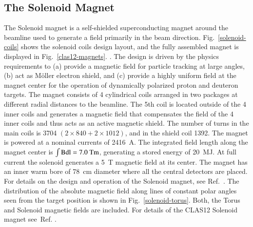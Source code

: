 \documentclass[final,3p,times,twocolumn,authoryear]{elsarticle}
\begin{document}
\subsection{\rm The Solenoid Magnet}
The Solenoid magnet is a self-shielded superconducting magnet around the beamline used 
to generate a field primarily in the beam direction. Fig.~\ref{solenoid-coils} shows the solenoid coils design layout, 
and the fully assembled magnet is displayed in Fig.~\ref{clas12-magnets}.
. 
The design is driven by the physics requirements to (a) provide 
a magnetic field for particle tracking at large angles, (b) act as {\rm M\"oller} electron shield, and (c) provide 
a highly uniform field at the magnet center for the operation of dynamically polarized proton and deuteron targets.
The magnet consists of 4 cylindrical coils arranged in two packages at different radial distances to the beamline. 
The 5th coil is located outside of the 4 inner coils and generates a magnetic field that compensates the field 
of the 4 inner coils and thus acts as an active magnetic shield. The number of turns in the main coils is 
3704 $(2 \times 840 + 2 \times 1012)$, and in the shield coil 1392. The magnet is powered at a nominal currents of 2416~A. 
The integrated field length along the magnet center is $\rm \int Bdl = 7.0 \rm~Tm$, generating a stored energy of 20~MJ.  
At full current the solenoid generates a 5~T magnetic field at its center. The magnet has an inner warm bore of 78~cm diameter where all the 
 central detectors are placed.  For details on the design and operation of the Solenoid magnet, see Ref.~\cite{clas12-magnets}. The distribution of the absolute magnetic field along lines of constant polar angles seen from the target position is shown in Fig.~\ref{solenoid-torus}. Both, the Torus and Solenoid magnetic fields are included. For details of the CLAS12 Solenoid magnet see~Ref. \cite{clas12-magnets}. 
\end{document}
